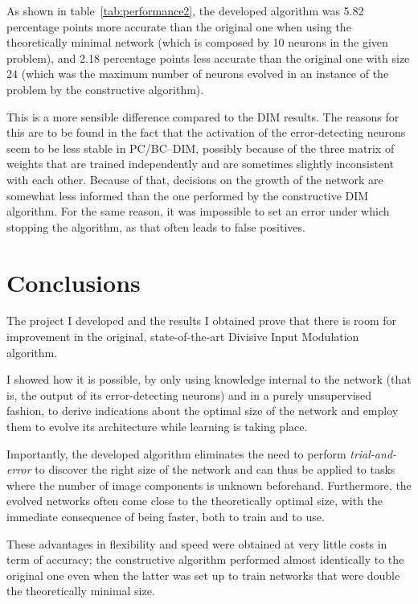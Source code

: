 \documentclass[11pt,a4paper]{report}
\begin{document}
				As shown in table~\ref{tab:performance2}, the developed algorithm was 5.82 percentage points more accurate than the original one when using the theoretically minimal network (which is composed by 10 neurons in the given problem), and 2.18 percentage points less accurate than the original one with size 24 (which was the maximum number of neurons evolved in an instance of the problem by the constructive algorithm).
				
				This is a more sensible difference compared to the DIM results. The reasons for this are to be found in the fact that the activation of the error-detecting neurons seem to be less stable in PC/BC--DIM, possibly because of the three matrix of weights that are trained independently and are sometimes slightly inconsistent with each other. Because of that, decisions on the growth of the network are somewhat less informed than the one performed by the constructive DIM algorithm.
				For the same reason, it was impossible to set an error under which stopping the algorithm, as that often leads to false positives.
				

	\chapter{Conclusions}
		The project I developed and the results I obtained prove that there is room for improvement in the original, state-of-the-art Divisive Input Modulation algorithm.
		
		I showed how it is possible, by only using knowledge internal to the network (that is, the output of its error-detecting neurons) and in a purely unsupervised fashion, to derive indications about the optimal size of the network and employ them to evolve its architecture while learning is taking place.
		
		Importantly, the developed algorithm eliminates the need to perform \emph{trial-and-error} to discover the right size of the network and can thus be applied to tasks where the number of image components is unknown beforehand. Furthermore, the evolved networks often come close to the theoretically optimal size, with the immediate consequence of being faster, both to train and to use.
		
		These advantages in flexibility and speed were obtained at very little costs in term of accuracy; the constructive algorithm performed almost identically to the original one even when the latter was set up to train networks that were double the theoretically minimal size.
		
\end{document}
